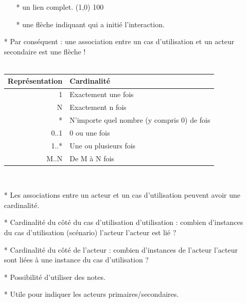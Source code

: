 \documentclass[12pt]{article}
\begin{document}
\begin{itemize}
\begin{itemize}
	\item [*] un lien complet. \line(1,0) {100}
	\item [*] une flèche indiquant qui a initié l'interaction.
\end{itemize}
\item [*] Par conséquent : une association entre un cas d'utilisation et un acteur secondaire est une flèche !\\ 
\\
\begin{tabular}{|r|l|}
	\hline
	Représentation & Cardinalité \\
	\hline
1 & Exactement une fois \\
	N & Exactement n fois  \\
	* & N'importe quel nombre (y compris 0) de fois \\
	0..1 & 0 ou une fois \\
	1..* & Une ou plusieurs fois\\
	M..N & De M à N fois\\
	\hline
\end{tabular}
\\
\item[*] Les associations entre un acteur
et un cas d'utilisation peuvent avoir une
cardinalité.
\item[*] Cardinalité du côté du cas d'utilisation
d'utilisation : combien d'instances du
cas d'utilisation (scénario) l'acteur
l'acteur est lié ?
\item[*] Cardinalité du côté de l'acteur :
combien d'instances de l'acteur
l'acteur sont liées à une instance
du cas d'utilisation ?
\item[*] Possibilité d'utiliser des notes.
\item [*]  Utile pour indiquer
les acteurs primaires/secondaires.
\end{itemize}
\end{document}
